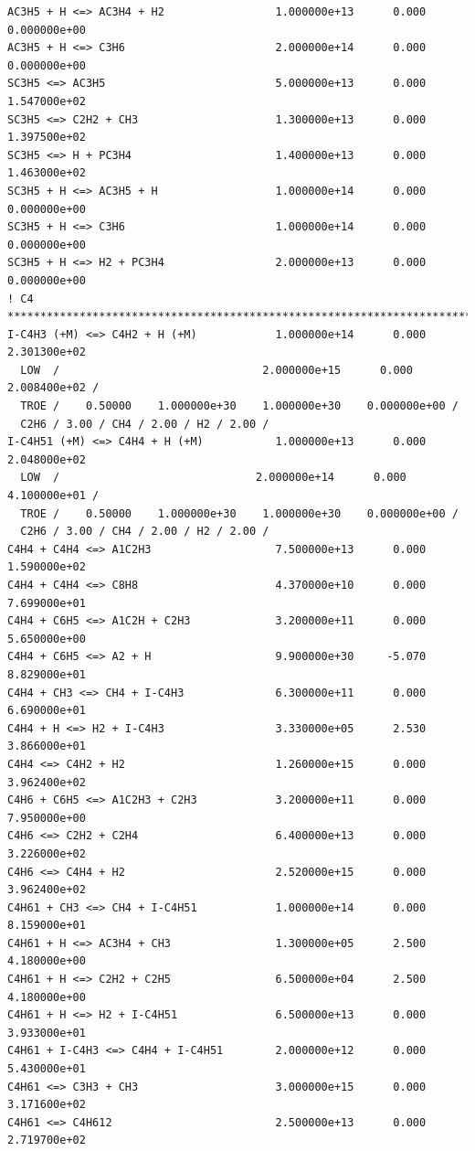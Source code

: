 \begin{verbatim}
AC3H5 + H <=> AC3H4 + H2                 1.000000e+13      0.000    0.000000e+00
AC3H5 + H <=> C3H6                       2.000000e+14      0.000    0.000000e+00
SC3H5 <=> AC3H5                          5.000000e+13      0.000    1.547000e+02
SC3H5 <=> C2H2 + CH3                     1.300000e+13      0.000    1.397500e+02
SC3H5 <=> H + PC3H4                      1.400000e+13      0.000    1.463000e+02
SC3H5 + H <=> AC3H5 + H                  1.000000e+14      0.000    0.000000e+00
SC3H5 + H <=> C3H6                       1.000000e+14      0.000    0.000000e+00
SC3H5 + H <=> H2 + PC3H4                 2.000000e+13      0.000    0.000000e+00
! C4 ***************************************************************************
I-C4H3 (+M) <=> C4H2 + H (+M)            1.000000e+14      0.000    2.301300e+02
  LOW  /                               2.000000e+15      0.000    2.008400e+02 /
  TROE /    0.50000    1.000000e+30    1.000000e+30    0.000000e+00 /
  C2H6 / 3.00 / CH4 / 2.00 / H2 / 2.00 / 
I-C4H51 (+M) <=> C4H4 + H (+M)           1.000000e+13      0.000    2.048000e+02
  LOW  /                              2.000000e+14      0.000    4.100000e+01 /
  TROE /    0.50000    1.000000e+30    1.000000e+30    0.000000e+00 /
  C2H6 / 3.00 / CH4 / 2.00 / H2 / 2.00 / 
C4H4 + C4H4 <=> A1C2H3                   7.500000e+13      0.000    1.590000e+02
C4H4 + C4H4 <=> C8H8                     4.370000e+10      0.000    7.699000e+01
C4H4 + C6H5 <=> A1C2H + C2H3             3.200000e+11      0.000    5.650000e+00
C4H4 + C6H5 <=> A2 + H                   9.900000e+30     -5.070    8.829000e+01
C4H4 + CH3 <=> CH4 + I-C4H3              6.300000e+11      0.000    6.690000e+01
C4H4 + H <=> H2 + I-C4H3                 3.330000e+05      2.530    3.866000e+01
C4H4 <=> C4H2 + H2                       1.260000e+15      0.000    3.962400e+02
C4H6 + C6H5 <=> A1C2H3 + C2H3            3.200000e+11      0.000    7.950000e+00
C4H6 <=> C2H2 + C2H4                     6.400000e+13      0.000    3.226000e+02
C4H6 <=> C4H4 + H2                       2.520000e+15      0.000    3.962400e+02
C4H61 + CH3 <=> CH4 + I-C4H51            1.000000e+14      0.000    8.159000e+01
C4H61 + H <=> AC3H4 + CH3                1.300000e+05      2.500    4.180000e+00
C4H61 + H <=> C2H2 + C2H5                6.500000e+04      2.500    4.180000e+00
C4H61 + H <=> H2 + I-C4H51               6.500000e+13      0.000    3.933000e+01
C4H61 + I-C4H3 <=> C4H4 + I-C4H51        2.000000e+12      0.000    5.430000e+01
C4H61 <=> C3H3 + CH3                     3.000000e+15      0.000    3.171600e+02
C4H61 <=> C4H612                         2.500000e+13      0.000    2.719700e+02

\end{verbatim}
